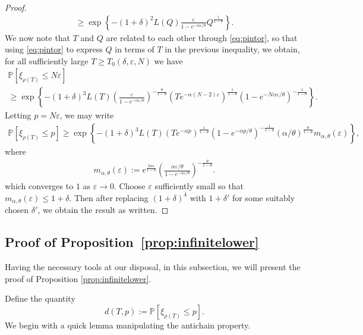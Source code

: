 \documentclass[a4,12pt]{amsart}
\numberwithin{equation}{section}
\begin{document}
\begin{proof}
\begin{align*}
			\geq \exp \left\{ - (1+\delta)^2 L(Q) \frac{\varepsilon}{1 - e^{ - \alpha \varepsilon/\theta}} 
			Q^{ \frac{1}{1-\theta}}    \right\}.
		\end{align*}
		We now note that $T$ and $Q$ are related to each other through \eqref{eq:pintor}, 
		so that using \eqref{eq:pintor} to express $Q$ in terms of $T$ in the previous inequality, 
		we obtain, for all sufficiently large $T \geq T_0(\delta,\varepsilon,N)$ we have
		\begin{multline*} 
			\mathbb{P}\left[ \xi_{\rho(T)} \leq N\varepsilon \right]
				\\ 
               \geq \exp \left\{ -  (1+\delta)^3 L(T) 
				\left( \frac{\varepsilon}{1-e^{-\alpha \varepsilon/\theta}} \right)^{ - \frac{\theta}{1-\theta}}  (T e^{ - \alpha (N-2)\varepsilon} )^{\frac{1}{1-\theta}} (1 - e^{ - N \alpha \varepsilon/\theta} )^{-\frac{1}{1-\theta}} \right\}.
		\end{multline*}
		Letting $ p = N\varepsilon$, we may write
		\begin{align*} 
		\mathbb{P}\left[ \xi_{\rho(T)} \leq p \right] 
			\geq \exp \left\{ -  (1+\delta)^3 L(T) (T e^{ - \alpha p} )^{\frac{1}{1-\theta}} 
			(1 - e^{ - \alpha p /\theta} )^{-\frac{1}{1-\theta}} 
			(\alpha/\theta)^{\frac{\theta}{1-\theta}} m_{\alpha,\theta}(\varepsilon) \right\},
		\end{align*}
		where
		\begin{align*}
			m_{\alpha,\theta}(\varepsilon) := 
			e^{\frac{2\alpha \varepsilon}{1-\theta}} 
			\left( \frac{\alpha \varepsilon/\theta}{1-e^{-\alpha \varepsilon/\theta}} \right)^{ - \frac{\theta}{1-\theta}}.
		\end{align*}
		which converges to $1$ as $\varepsilon \to 0$. 
		Choose $\varepsilon$ sufficiently small so that $m_{\alpha,\theta}(\varepsilon) \leq 1 + \delta$. 
		Then after replacing $(1+\delta)^4$ with $1+\delta'$ for some suitably chosen $\delta'$, 
		we obtain the result as written.
	\end{proof}

\subsection{Proof of Proposition~\ref{prop:infinitelower}}
	Having the necessary tools at our disposal, in this subsection, we will present the proof of Proposition \ref{prop:infinitelower}. 

    Define the quantity
    \begin{equation}
    d(T,p) := \mathbb{P} [ \xi_{\rho(T)} \leq p ].
    \end{equation}
    We begin with a quick lemma manipulating the antichain property.
\end{document}
